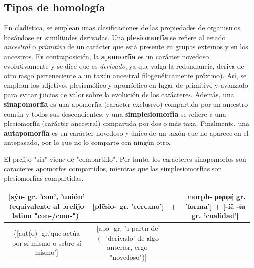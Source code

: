 \subsection{Tipos de homología}
En cladística, se emplean unas clasificaciones de las propiedades de organismos basándose en similitudes derivadas. Una \textbf{plesiomorfía} se refiere al estado \textit{ancestral} o \textit{primitivo} de un carácter que está presente en grupos externos y en los ancestros. En contraposición, la \textbf{apomorfía} es un carácter novedoso evolutivamente y se dice que es \textit{derivado}, ya que valga la redundancia, deriva de otro rasgo perteneciente a un taxón ancestral filogenéticamente próximo). Así, se emplean los adjetivos plesiomófico y apomórfico en lugar de primitivo y avanzado para evitar juicios de valor sobre la evolución de los carácteres. 
Además, una \textbf{sinapomorfía} es una apomorfía (carácter exclusivo) compartida por un ancestro común y todos sus descendientes; y una \textbf{simplesiomorfía} se refiere a una plesiomorfía (carácter ancestral) compartida por dos o más taxa. Finalmente, una \textbf{autapomorfía} es un carácter novedoso y único de un taxón que no aparece en el antepasado, por lo que no lo comparte con ningún otro. 

\begin{table}[htbp]
\begin{mdframed}[backgroundcolor=black!10]
    \centering
    El prefijo "sin" viene de "compartido". Por tanto, los caracteres sinapomorfos son caracteres apomorfos compartidos, mientras que las simplesiomorfías son plesiomorfías compartidas.
    \end{mdframed}
\end{table}

\begin{tabular}{|c|c|c|c|}
\hline 
{[sýn- gr. 'con', 'unión' (equivalente al prefijo latino "con-/com-")]} & {[plēsio- gr. 'cercano']} & \multirow{2}{1em}{+} & \multirow{2}{12em}{[morph- μορφή gr. 'forma'] + [-íā -ίᾱ gr. 'cualidad']} \\
\hline 
\{[aut(o)- gr.'que actúa por sí mismo o sobre sí mismo']} & {[apó- gr. 'a partir de' (~ 'derivado' de algo anterior, ergo: "novedoso")]} & & \\ 
\hline 
\end{tabular}


